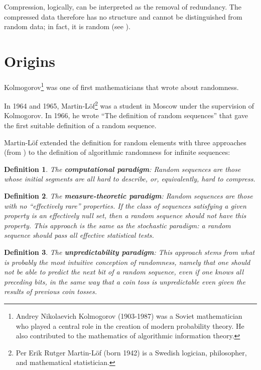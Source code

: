 \documentclass[12pt, a4paper]{report}
\newtheorem{definition}{Definition}[section] %
\begin{document}
Compression, logically, can be interpreted as the removal of redundancy.
The compressed data therefore has no structure and cannot be distinguished from random data; in fact, it is random
(see \cite{AConciseIntroductionToDataCompression}).

\section{Origins}

Kolmogorov\footnote{Andrey Nikolaevich Kolmogorov (1903-1987) was a Soviet mathematician who played a central role in the creation
of modern probability theory. He also contributed to the mathematics of algorithmic information theory.} was one of first
mathematicians that wrote about randomness.

In 1964 and 1965, Martin-Löf\footnote{Per Erik Rutger Martin-Löf (born 1942) is a Swedish logician, philosopher, and mathematical
statistician.} was a student in Moscow under the supervision of Kolmogorov.
In 1966, he wrote ``The definition of random sequences'' that gave the first suitable definition of a random sequence.

Martin-Löf extended the definition for random elements with three approaches (from \cite{AlgorithmicRandomnessAndComplexity}) to
the definition of algorithmic randomness for infinite sequences:

\begin{definition}
The \textbf{computational paradigm}: Random sequences are those whose initial segments are all hard  to describe, or,
equivalently, hard to compress.
\end{definition}

\begin{definition}
The \textbf{measure-theoretic paradigm}: Random sequences  are those with no ``effectively rare'' properties.
If the class of sequences satisfying a given property is an effectively null set, then a random sequence should not have this
property.
This approach is the same as the stochastic paradigm: a random sequence should pass all effective statistical tests.
\end{definition}

\begin{definition}
The \textbf{unpredictability paradigm}: This approach stems from what is probably the most intuitive conception of randomness,
namely that one should not be able to predict the next bit of a random sequence, even if one knows all preceding bits, in the same
way that a coin toss is unpredictable even given the results of previous coin tosses.
\end{definition}
\end{document}
